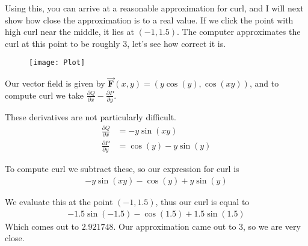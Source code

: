 \documentclass{article}
\begin{document}
    Using this, you can arrive at a reasonable approximation for curl, and I will next show how close the approximation is to a real value.
    If we click the point with high curl near the middle, it lies at $(-1, 1.5)$.
    The computer approximates the curl at this point to be roughly $3$, let's see how correct it is.
    \begin{figure}[t]
        \texttt{[image: Plot]}
        \centering
        \end{figure}

    Our vector field is given by $\vec{ \mathbf{F} } (x, y) = (y \cos(y), \cos(xy))$, and to compute curl we take $\frac{\partial Q}{\partial x} - \frac{\partial P}{\partial y}$.
    
    These derivatives are not particularly difficult. 
    \begin{align*}
        \frac{\partial Q}{\partial x} &= -y\sin(xy) \\ 
        \frac{\partial P}{\partial y} &= \cos(y) - y\sin(y)
    \end{align*}

    To compute curl we subtract these, so our expression for curl is 
    \begin{gather*}
        -y\sin(xy) - \cos(y) + y\sin(y)
    \end{gather*}

    We evaluate this at the point $(-1, 1.5)$, thus our curl is equal to 
    \begin{gather*}
        -1.5\sin(-1.5) - \cos(1.5) + 1.5\sin(1.5) 
    \end{gather*}
    Which comes out to $2.921748$.
    Our approximation came out to $3$, so we are very close.
\end{document}
